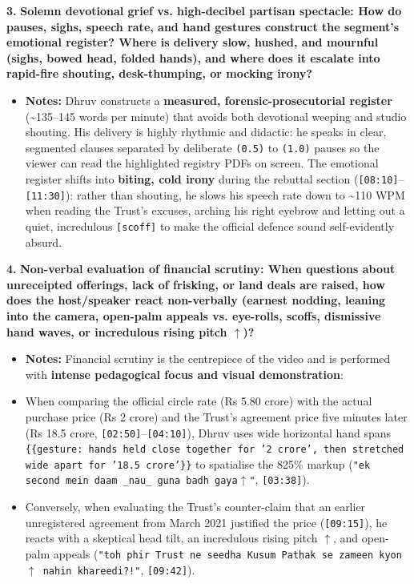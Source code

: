 \documentclass[10pt,a4paper]{article}
\begin{document}
\noindent\textbf{3.} \textbf{Solemn devotional grief vs. high-decibel partisan spectacle: How do pauses, sighs, speech rate, and hand gestures construct the segment's emotional register? Where is delivery slow, hushed, and mournful (sighs, bowed head, folded hands), and where does it escalate into rapid-fire shouting, desk-thumping, or mocking irony?}\par\smallskip
\begin{itemize}
  \item \textbf{Notes:}
Dhruv constructs a \textbf{measured, forensic-prosecutorial register} (\textasciitilde{}135--145 words per minute) that avoids both devotional weeping and studio shouting. His delivery is highly rhythmic and didactic: he speaks in clear, segmented clauses separated by deliberate \texttt{(0.5)} to \texttt{(1.0)} pauses so the viewer can read the highlighted registry PDFs on screen. The emotional register shifts into \textbf{biting, cold irony} during the rebuttal section (\texttt{[08:10]}--\texttt{[11:30]}): rather than shouting, he slows his speech rate down to \textasciitilde{}110 WPM when reading the Trust's excuses, arching his right eyebrow and letting out a quiet, incredulous \texttt{[scoff]} to make the official defence sound self-evidently absurd.\par\smallskip
\end{itemize}

\noindent\textbf{4.} \textbf{Non-verbal evaluation of financial scrutiny: When questions about unreceipted offerings, lack of frisking, or land deals are raised, how does the host/speaker react non-verbally (earnest nodding, leaning into the camera, open-palm appeals vs. eye-rolls, scoffs, dismissive hand waves, or incredulous rising pitch $\uparrow$)?}\par\smallskip
\begin{itemize}
  \item \textbf{Notes:}
Financial scrutiny is the centrepiece of the video and is performed with \textbf{intense pedagogical focus and visual demonstration}:\par\smallskip
  \item When comparing the official circle rate (Rs 5.80 crore) with the actual purchase price (Rs 2 crore) and the Trust's agreement price five minutes later (Rs 18.5 crore, \texttt{[02:50]}--\texttt{[04:10]}), Dhruv uses wide horizontal hand spans \texttt{\{\{gesture: hands held close together for '2 crore', then stretched wide apart for '18.5 crore'\}\}} to spatialise the 825\% markup (\texttt{"ek second mein daam \_nau\_ guna badh gaya$\uparrow$"}, \texttt{[03:38]}).
  \item Conversely, when evaluating the Trust's counter-claim that an earlier unregistered agreement from March 2021 justified the price (\texttt{[09:15]}), he reacts with a skeptical head tilt, an incredulous rising pitch \texttt{$\uparrow$}, and open-palm appeals (\texttt{"toh phir Trust ne seedha Kusum Pathak se zameen kyon$\uparrow$ nahin khareedi?!"}, \texttt{[09:42]}).
\end{itemize}
\end{document}

